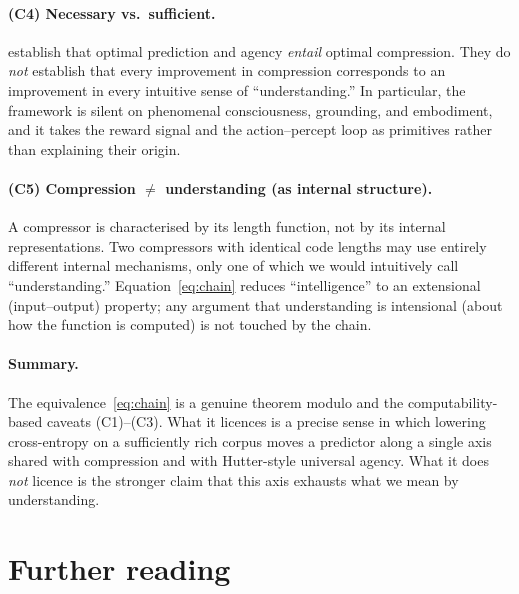 \documentclass[12pt,a4paper]{article}
\theoremstyle{plain}
\theoremstyle{definition}
\begin{document}
\paragraph{(C4) Necessary vs.\ sufficient.}
 establish that optimal prediction
and agency \emph{entail} optimal compression.  They do \emph{not}
establish that every improvement in compression corresponds to an
improvement in every intuitive sense of ``understanding.''  In
particular, the framework is silent on phenomenal consciousness,
grounding, and embodiment, and it takes the reward signal and the
action--percept loop as primitives rather than explaining their
origin.

\paragraph{(C5) Compression $\ne$ understanding (as internal structure).}
A compressor is characterised by its length function, not by its
internal representations.  Two compressors with identical code
lengths may use entirely different internal mechanisms, only one of
which we would intuitively call ``understanding.''
Equation~\eqref{eq:chain} reduces ``intelligence'' to an extensional
(input--output) property; any argument that understanding is
intensional (about how the function is computed) is not touched by
the chain.

\paragraph{Summary.}
The equivalence~\eqref{eq:chain} is a genuine theorem modulo
 and the computability-based caveats
(C1)--(C3).  What it licences is a precise sense in which lowering
cross-entropy on a sufficiently rich corpus moves a predictor along a
single axis shared with compression and with Hutter-style universal
agency.  What it does \emph{not} licence is the stronger claim that
this axis exhausts what we mean by understanding.

\section*{Further reading}
\end{document}

